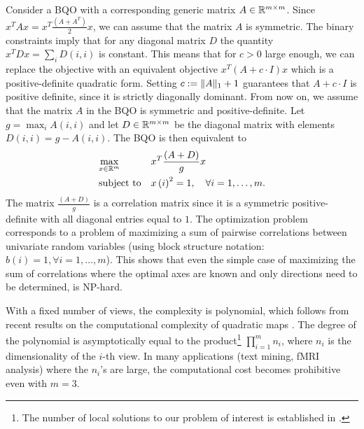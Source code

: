 Consider a BQO with a corresponding generic matrix $A \in \mathbb{R}^{m\times m}$. Since $x^T A x = x^T
\frac{\left(A + A^T\right)}{2} x$, we can assume that the matrix $A$ is
symmetric. The binary constraints imply that for any diagonal
matrix $D$ the quantity $x^T D x = \sum_i D\left(i,i\right)$ is
constant. This means that for $c > 0$ large enough, we can
replace the objective with an equivalent objective $x^T \left(A + c
\cdot I\right) x$ which is a positive-definite quadratic form. Setting $c := \lVert A\rVert_1 + 1$
guarantees that $A + c\cdot I$ is positive definite, since it is strictly diagonally dominant.
From now on, we assume that the matrix $A$ in the BQO is symmetric and
positive-definite.  Let $g = \max_i{A\left(i,i\right)}$ and let $D \in
\mathbb{R}^{m\times m}$ be the diagonal matrix with elements
$D\left(i,i\right) = g - A\left(i,i\right)$. The BQO is then equivalent to
\begin{equation}\label{eq:binqpcor}
\begin{aligned}
& \underset{x \in \mathbb{R}^m}{\text{max}}
& & x^T \frac{\left(A + D\right)}{g} x  \\
& \text{subject to}
& & x\left(i\right)^2 = 1,  \quad\forall i =1,\ldots,m.\\
\end{aligned}
\end{equation}
The matrix $\frac{\left(A + D\right)}{g}$ is a correlation matrix since it
is a symmetric positive-definite with all diagonal entries
equal to $1$. The optimization problem corresponds to a problem
of maximizing a sum of pairwise correlations between univariate
random variables (using block structure notation: $b\left(i\right) = 1,
\forall i = 1,\ldots, m$). This shows that even the simple case
of maximizing the sum of correlations where the optimal axes are
known and only directions need to be determined, is NP-hard.

With a fixed number of views, the complexity is polynomial, which follows from
 recent results on the computational complexity of quadratic maps \cite{Grigoriev}. The degree of the polynomial is asymptotically
equal to the product\footnote{The number of local solutions to our problem of
interest is established in \cite{Chu}.} $\prod_{i=1}^m n_i$, where $n_i$ is
the dimensionality of the $i$-th view. In many applications (text mining, fMRI
analysis) where the $n_i$'s are large, the computational cost becomes prohibitive
even with $m=3$.


